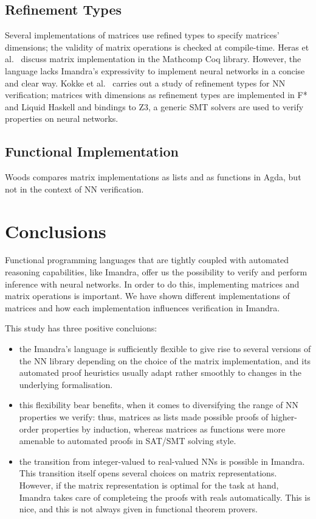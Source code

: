 \documentclass[runningheads]{llncs}
\begin{document}
\subsection{Refinement Types}
Several implementations of matrices use refined types to specify matrices' dimensions; the validity of matrix operations is checked at compile-time.
Heras et al.~\cite{heras_incidence_2011} discuss matrix implementation in the Mathcomp Coq library. However, the language lacks Imandra's expressivity to implement neural networks in a concise and clear way.
Kokke et al.~\cite{kokke_neural_2020} carries out a study of refinement types for NN verification; matrices with dimensions as refinement types are implemented in F* and Liquid Haskell and bindings to Z3, a generic SMT solvers are used to verify properties on neural networks.

\subsection{Functional Implementation}

Woods \cite{wood_vectors_2019} compares matrix implementations as lists and as functions in Agda, but not in the context of NN verification.
\fi


\section{Conclusions}
Functional programming languages that are tightly coupled with automated reasoning capabilities, like Imandra, offer us the possibility to verify and perform inference with neural networks. In order to do this, implementing matrices and matrix operations is important.
We have shown different implementations of matrices and how each implementation influences verification in Imandra.

This study has three positive concluions:
\begin{itemize}
\item the Imandra's language is sufficiently flexible to give rise to several versions of the NN library depending on the choice of the matrix implementation, and its automated proof heuristics
  usually adapt rather smoothly to changes in the underlying formalisation.

\item this flexibility bear benefits, when it comes to diversifying the range of NN properties we verify: thus, matrices as lists made possible proofs of higher-order properties by induction, whereas matrices as functions were more amenable to automated proofs in SAT/SMT solving style.

  \item the transition from integer-valued to real-valued NNs is possible in Imandra. This transition itself opens several choices on matrix representations. However, if the matrix representation is optimal for the task at hand, Imandra takes care of completeing the proofs with reals automatically. This is nice, and this is not always given in functional theorem provers.
\end{itemize}
\end{document}
